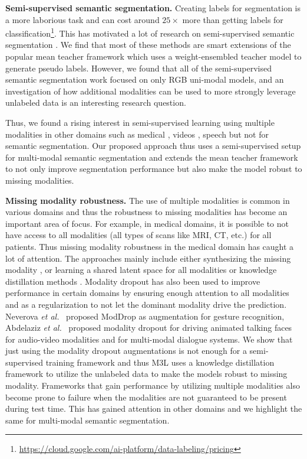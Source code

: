 \documentclass[10pt,twocolumn,letterpaper]{article}
\begin{document}
\noindent\textbf{Semi-supervised semantic segmentation.} Creating labels for segmentation is a more laborious task and can cost around $25\times$ more than getting labels for classification\footnote{\href{https://cloud.google.com/ai-platform/data-labeling/pricing}{https://cloud.google.com/ai-platform/data-labeling/pricing}}. This has motivated a lot of research on semi-supervised semantic segmentation \cite{chen2021-CPS, u2pl, zou2020pseudoseg, pc2seg, gct, cct, liu2022perturbed}. We find that most of these methods are smart extensions of the popular mean teacher framework \cite{mt} which uses a weight-ensembled teacher model to generate pseudo labels. However, we found that  all of the semi-supervised semantic segmentation work focused on only RGB uni-modal models, and an investigation of how additional modalities can be used to more strongly leverage unlabeled data is an interesting research question. 

Thus, we found a rising interest in semi-supervised learning using multiple modalities in other domains such as medical \cite{chartsias2020disentangle, 9250615}, videos \cite{xiong2021multiview}, speech \cite{sunkara2020multimodal} but not for semantic segmentation. Our proposed approach thus uses a semi-supervised setup for multi-modal semantic segmentation and extends the mean teacher \cite{mt} framework to not only improve segmentation performance but also make the model robust to missing modalities.

\noindent\textbf{Missing modality robustness.} The use of multiple modalities is common in various domains and thus the robustness to missing modalities has become an important area of focus. For example, in medical domains, it is possible to not have access to all modalities (all types of scans like MRI, CT, etc.) for all patients. 
Thus missing modality robustness in the medical domain has caught a lot of attention.
The approaches mainly include either synthesizing the missing modality \cite{jog2017random, sharma2019missing, yu20183d}, or learning a shared latent space for all modalities \cite{shen2019brain, urn, dorent2019hetero} or knowledge distillation methods \cite{wang2020multimodal, azad2022smu}. Modality dropout has also been used to improve performance in certain domains by ensuring enough attention to all modalities and as a regularization to not let the dominant modality drive the prediction. 
Neverova \textit{et al.}~\cite{neverova2015moddrop} proposed ModDrop as augmentation for gesture recognition, Abdelaziz \textit{et al.}~\cite{hussen2020modality} proposed modality dropout for driving animated talking faces for audio-video modalities and \cite{9746613} for multi-modal dialogue systems. 
We show that just using the modality dropout augmentations is not enough for a semi-supervised training framework and thus M3L uses a knowledge distillation framework to utilize the unlabeled data to make the models robust to missing modality.
Frameworks that gain performance by utilizing multiple modalities also become prone to failure when the modalities are not guaranteed to be present during test time. This has gained attention in other domains and we highlight the same for multi-modal semantic segmentation. 
\end{document}
